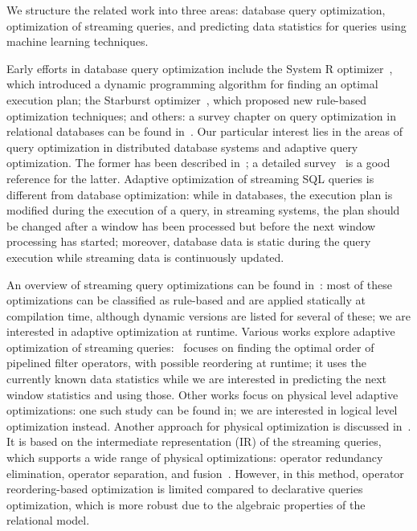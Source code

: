 \label {sec:fs-optimization-related-work}

We structure the related work into three areas: database query optimization, optimization of streaming queries, and predicting data statistics for queries using machine learning techniques.

Early efforts in database query optimization include the System R optimizer~\cite{selinger1979access}, which introduced a dynamic programming algorithm for finding an optimal execution plan; the Starburst optimizer~\cite{haas1989extensible}, which proposed new rule-based optimization techniques; and others: a survey chapter on query optimization in relational databases can be found in~\cite{Neumann2018optimization}. Our particular interest lies in the areas of query optimization in distributed database systems and adaptive query optimization. The former has been described in~\cite{kossmann2000thestate}; a detailed survey~\cite{deshpande2007adaptive} is a good reference for the latter. Adaptive optimization of streaming SQL queries is different from database optimization: while in databases, the execution plan is modified during the execution of a query, in streaming systems, the plan should be changed after a window has been processed but before the next window processing has started; moreover, database data is static during the query execution while streaming data is continuously updated.

An overview of streaming query optimizations can be found in~\cite{hirzel2014catalog}: most of these optimizations can be classified as rule-based and are applied statically at compilation time, although dynamic versions are listed for several of these; we are interested in adaptive optimization at runtime. Various works explore adaptive optimization of streaming queries:~\cite{babu2004adaptive} focuses on finding the optimal order of pipelined filter operators, with possible reordering at runtime; it uses the currently known data statistics while we are interested in predicting the next window statistics and using those. Other works focus on physical level adaptive optimizations: one such study can be found in\cite{grulich2020grizzly}; we are interested in logical level optimization instead. Another approach for physical optimization is discussed in~\cite{kroll2019arc}. It is based on the intermediate representation (IR) of the streaming queries, which supports a wide range of physical optimizations: operator redundancy elimination, operator separation, and fusion~\cite{hirzel2014catalog}. However, in this method, operator reordering-based optimization is limited compared to declarative queries optimization, which is more robust due to the algebraic properties of the relational model. 

